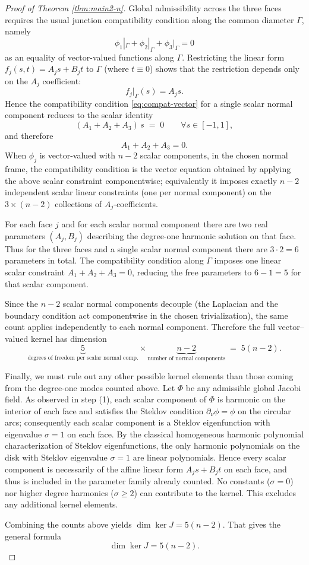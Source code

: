 \documentclass[10pt,a4paper]{amsart}
\begin{document}
\begin{proof}[Proof of Theorem \ref{thm:main2-n}]
Global admissibility across the three faces requires the usual junction compatibility condition along the common diameter $\Gamma$, namely
\begin{equation}\label{eq:compat-vector}
\phi_1|_{\Gamma} + \phi_2|_{\Gamma} + \phi_3|_{\Gamma} = 0
\end{equation}
as an equality of vector-valued functions along $\Gamma$.  Restricting the linear form $f_j(s,t)=A_j s + B_j t$ to $\Gamma$ (where $t\equiv0$) shows that the restriction depends only on the $A_j$ coefficient:
\[
f_j|_{\Gamma}(s) = A_j s.
\]
Hence the compatibility condition \eqref{eq:compat-vector} for a single scalar normal component reduces to the scalar identity
\[
(A_1 + A_2 + A_3)\, s \;=\; 0 \qquad\forall s\in[-1,1],
\]
and therefore
\[
A_1 + A_2 + A_3 = 0.
\]
When $\phi_j$ is vector-valued with $n-2$ scalar components, in the chosen normal frame, the compatibility condition is the vector equation obtained by applying the above scalar constraint componentwise; equivalently it imposes exactly $n-2$ independent scalar linear constraints (one per normal component) on the $3\times (n-2)$ collections of $A_j$-coefficients.
\medskip


For each face $j$ and for each scalar normal component there are two real parameters $(A_j,B_j)$ describing the degree-one harmonic solution on that face.  Thus for the three faces and a single scalar normal component there are $3\cdot 2=6$ parameters in total.  The compatibility condition along $\Gamma$ imposes one linear scalar constraint $A_1+A_2+A_3=0$, reducing the free parameters to $6-1=5$ for that scalar component.

Since the $n-2$ scalar normal components decouple (the Laplacian and the boundary condition act componentwise in the chosen trivialization), the same count applies independently to each normal component.  Therefore the full vector--valued kernel has dimension
\[
\underbrace{5}_{\text{degrees of freedom per scalar normal comp.}}\times \underbrace{n-2}_{\text{number of normal components}} \;=\; 5(n-2).
\]
\medskip


Finally, we must rule out any other possible kernel elements than those coming from the degree-one modes counted above.  Let $\Phi$ be any admissible global Jacobi field.  As observed in step (1), each scalar component of $\Phi$ is harmonic on the interior of each face and satisfies the Steklov condition $\partial_\nu \phi = \phi$ on the circular arcs; consequently each scalar component is a Steklov eigenfunction with eigenvalue $\sigma=1$ on each face.  By the classical homogeneous harmonic polynomial characterization of Steklov eigenfunctions, the only harmonic polynomials on the disk with Steklov eigenvalue $\sigma=1$ are linear polynomials.  Hence every scalar component is necessarily of the affine linear form $A_j s + B_j t$ on each face, and thus is included in the parameter family already counted.  No constants ($\sigma=0$) nor higher degree harmonics ($\sigma\ge2$) can contribute to the kernel.  This excludes any additional kernel elements.

\medskip

Combining the counts above yields $\dim\ker J=5(n-2)$.  That gives the general formula
\[
\dim\ker J = 5(n-2).
\]
\end{proof}
\end{document}
